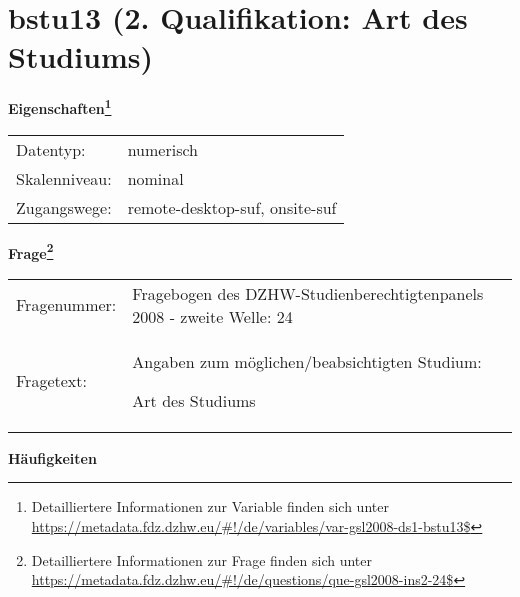 
    \setcounter{footnote}{0}

    \vspace*{-1.8cm}
	\section{bstu13 (2. Qualifikation: Art des Studiums)}
	\label{section:bstu13}



    \vspace*{0.5cm}
    \noindent\textbf{Eigenschaften\footnote{Detailliertere Informationen zur Variable finden sich unter
		\url{https://metadata.fdz.dzhw.eu/\#!/de/variables/var-gsl2008-ds1-bstu13$}}}\\
	\begin{tabularx}{\hsize}{@{}lX}
	Datentyp: & numerisch \\
	Skalenniveau: & nominal \\
	Zugangswege: &
	  remote-desktop-suf, 
	  onsite-suf
 \\
    \end{tabularx}



				\vspace*{0.5cm}
                \noindent\textbf{Frage\footnote{Detailliertere Informationen zur Frage finden sich unter
		              \url{https://metadata.fdz.dzhw.eu/\#!/de/questions/que-gsl2008-ins2-24$}}}\\
				\begin{tabularx}{\hsize}{@{}lX}
					Fragenummer: &
					  Fragebogen des DZHW-Studienberechtigtenpanels 2008 - zweite Welle:
					  24
 \\
					Fragetext: & Angaben zum möglichen/beabsichtigten Studium:\par  Art des Studiums \\
				\end{tabularx}





        		\vspace*{0.5cm}
                \noindent\textbf{Häufigkeiten}

